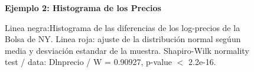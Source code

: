 \begin{figure}[H]
	\centering
	\textbf{Ejemplo 2: Histograma de los Precios}\par\medskip
	\caption{Linea negra:Histograma de las diferencias de los log-precios de la Bolsa de NY. Linea roja: ajuste de la distribución normal segúun media y desviación estandar de la muestra. Shapiro-Wilk normality test / data:  Dlnprecio / W = 0.90927, p-value $<$ 2.2e-16.}\label{figura5}
\end{figure}

